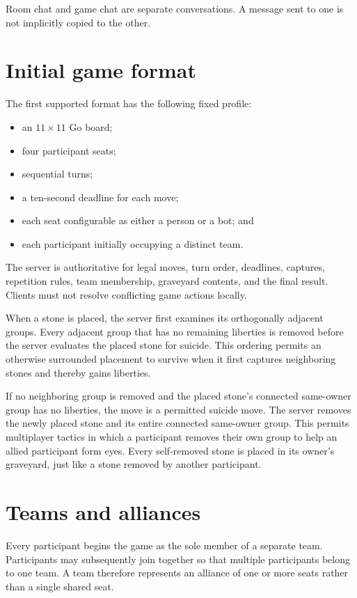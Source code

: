 \documentclass[11pt,oneside]{book}
\begin{document}
Room chat and game chat are separate conversations. A message sent to one is not implicitly copied to the other.

\section{Initial game format}
The first supported format has the following fixed profile:
\begin{itemize}
  \item an \(11\times 11\) Go board;
  \item four participant seats;
  \item sequential turns;
  \item a ten-second deadline for each move;
  \item each seat configurable as either a person or a bot; and
  \item each participant initially occupying a distinct team.
\end{itemize}

The server is authoritative for legal moves, turn order, deadlines, captures, repetition rules, team membership, graveyard contents, and the final result. Clients must not resolve conflicting game actions locally.

When a stone is placed, the server first examines its orthogonally adjacent groups. Every adjacent group that has no remaining liberties is removed before the server evaluates the placed stone for suicide. This ordering permits an otherwise surrounded placement to survive when it first captures neighboring stones and thereby gains liberties.

If no neighboring group is removed and the placed stone's connected same-owner group has no liberties, the move is a permitted suicide move. The server removes the newly placed stone and its entire connected same-owner group. This permits multiplayer tactics in which a participant removes their own group to help an allied participant form eyes. Every self-removed stone is placed in its owner's graveyard, just like a stone removed by another participant.

\section{Teams and alliances}
Every participant begins the game as the sole member of a separate team. Participants may subsequently join together so that multiple participants belong to one team. A team therefore represents an alliance of one or more seats rather than a single shared seat.
\end{document}
